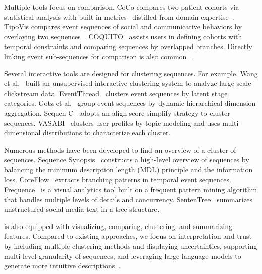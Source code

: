 Multiple tools focus on comparison. CoCo compares two patient cohorts via statistical analysis with built-in metrics~\cite{malik2015cohort} distilled from domain expertise~\cite{monroe2012exploring}. TipoVis compares event sequences of social and communicative behaviors by overlaying two sequences~\cite{han2015visual}. COQUITO~\cite{krause2015supporting} assists users in defining cohorts with temporal constraints and comparing sequences by overlapped branches.
Directly linking event sub-sequences for comparison is also common~\cite{qi2019stbins, meyer2009mizbee, zhao2023contextwing}.  

Several interactive tools are designed for clustering sequences. For example, Wang et al.~\cite{wang2016unsupervised} built an unsupervised interactive clustering system to analyze large-scale clickstream data. EventThread~\cite{guo2017eventthread} clusters event sequences by latent stage categories. Gotz et al.~\cite{gotz2019visual} group event sequences by dynamic hierarchical dimension aggregation. Sequen-C~\cite{magallanes2021sequen} adopts an align-score-simplify strategy to cluster sequences. VASABI~\cite{nguyen2019vasabi} clusters user profiles by topic modeling and uses multi-dimensional distributions to characterize each cluster.

Numerous methods have been developed to find an overview of a cluster of sequences. Sequence Synopsis~\cite{chen2017sequence} constructs a high-level overview of sequences by balancing the minimum description length (MDL) principle and the information loss. CoreFlow~\cite{liu2017coreflow} extracts branching patterns in temporal event sequences. Frequence~\cite{perer2014frequence} is a visual analytics tool built on a frequent pattern mining algorithm that handles multiple levels of details and concurrency. SentenTree~\cite{hu2016visualizing} summarizes unstructured social media text in a tree structure. 

\name{} is also equipped with visualizing, comparing, clustering, and summarizing features. Compared to existing approaches, we focus on interpretation and trust by including multiple clustering methods and displaying uncertainties, supporting multi-level granularity of sequences, and leveraging large language models to generate more intuitive descriptions~\cite{brown2020language}. 









